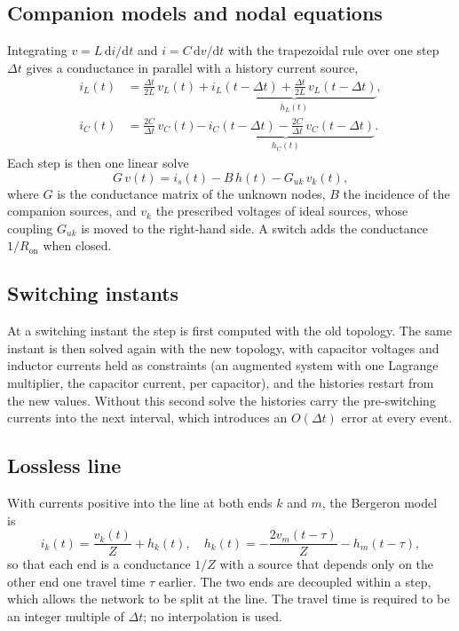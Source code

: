 \documentclass[conference]{IEEEtran}
\begin{document}
\subsection{Companion models and nodal equations}
Integrating $v=L\,\mathrm{d}i/\mathrm{d}t$ and $i=C\,\mathrm{d}v/\mathrm{d}t$ with the trapezoidal rule over one step $\Delta t$ gives a conductance in parallel with a history current source,
\begin{align}
i_L(t)&=\frac{\Delta t}{2L}\,v_L(t)+\underbrace{i_L(t-\Delta t)+\frac{\Delta t}{2L}\,v_L(t-\Delta t)}_{h_L(t)},\\
i_C(t)&=\frac{2C}{\Delta t}\,v_C(t)\underbrace{-\,i_C(t-\Delta t)-\frac{2C}{\Delta t}\,v_C(t-\Delta t)}_{h_C(t)}.
\end{align}
Each step is then one linear solve
\begin{equation}
G\,v(t)=i_s(t)-B\,h(t)-G_{uk}\,v_k(t),
\end{equation}
where $G$ is the conductance matrix of the unknown nodes, $B$ the incidence of the companion sources, and $v_k$ the prescribed voltages of ideal sources, whose coupling $G_{uk}$ is moved to the right-hand side. A switch adds the conductance $1/R_\mathrm{on}$ when closed.

\subsection{Switching instants}
At a switching instant the step is first computed with the old topology. The same instant is then solved again with the new topology, with capacitor voltages and inductor currents held as constraints (an augmented system with one Lagrange multiplier, the capacitor current, per capacitor), and the histories restart from the new values. Without this second solve the histories carry the pre-switching currents into the next interval, which introduces an $O(\Delta t)$ error at every event.

\subsection{Lossless line}
With currents positive into the line at both ends $k$ and $m$, the Bergeron model~\cite{dommel} is
\begin{equation}
i_k(t)=\frac{v_k(t)}{Z}+h_k(t),\quad h_k(t)=-\frac{2v_m(t-\tau)}{Z}-h_m(t-\tau),
\end{equation}
so that each end is a conductance $1/Z$ with a source that depends only on the other end one travel time $\tau$ earlier. The two ends are decoupled within a step, which allows the network to be split at the line. The travel time is required to be an integer multiple of $\Delta t$; no interpolation is used.
\end{document}
